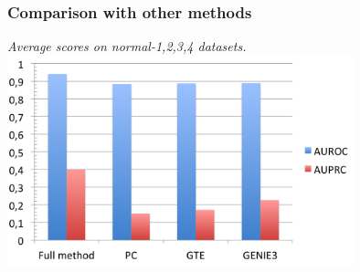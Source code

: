 \documentclass[final]{beamer}
\begin{document}

\begin{frame}
\frametitle{Comparison with other methods}


\begin{center}
\textit{Average scores on normal-{1,2,3,4} datasets.
}
\includegraphics[width=10cm]{images/data_method.png}
\end{center}


\end{frame}
\end{document}
